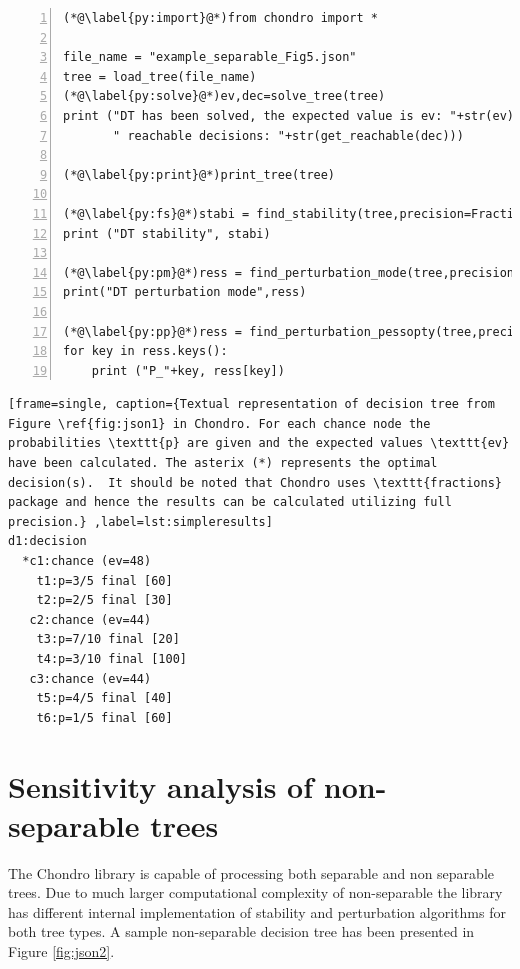 \documentclass[a4paper,10pt,english]{sphinxmanual}
\begin{document}
	\noindent\begin{minipage}{\linewidth}
		\begin{lstlisting}[frame=single,caption=Source code for separable probability,label=lst:codesimple,numbers=left] 
(*@\label{py:import}@*)from chondro import *

file_name = "example_separable_Fig5.json"
tree = load_tree(file_name)
(*@\label{py:solve}@*)ev,dec=solve_tree(tree)
print ("DT has been solved, the expected value is ev: "+str(ev)+ \
       " reachable decisions: "+str(get_reachable(dec)))

(*@\label{py:print}@*)print_tree(tree)

(*@\label{py:fs}@*)stabi = find_stability(tree,precision=Fraction("1/10000") )
print ("DT stability", stabi)

(*@\label{py:pm}@*)ress = find_perturbation_mode(tree,precision=Fraction("1/1000"))
print("DT perturbation mode",ress)

(*@\label{py:pp}@*)ress = find_perturbation_pessopty(tree,precision=Fraction("1/1000"))
for key in ress.keys():
	print ("P_"+key, ress[key])		
\end{lstlisting}
		
\end{minipage}		
		
\noindent\begin{minipage}{\linewidth}
\begin{lstlisting}[frame=single, caption={Textual representation of decision tree from Figure \ref{fig:json1} in Chondro. For each chance node the probabilities \texttt{p} are given and the expected values \texttt{ev} have been calculated. The asterix (*) represents the optimal decision(s).  It should be noted that Chondro uses \texttt{fractions} package and hence the results can be calculated utilizing full precision.} ,label=lst:simpleresults]		
d1:decision
  *c1:chance (ev=48)
    t1:p=3/5 final [60]
    t2:p=2/5 final [30]
   c2:chance (ev=44)
    t3:p=7/10 final [20]
    t4:p=3/10 final [100]
   c3:chance (ev=44)
    t5:p=4/5 final [40]
    t6:p=1/5 final [60]
\end{lstlisting}		
\end{minipage}	

	

	
\section{Sensitivity analysis of non-separable trees}

The Chondro library is capable of processing both separable and non separable trees. Due to much larger computational complexity of non-separable the library has different internal implementation of stability and perturbation algorithms for both tree types. A sample non-separable decision tree has been presented in Figure \ref{fig:json2}.
\end{document}
